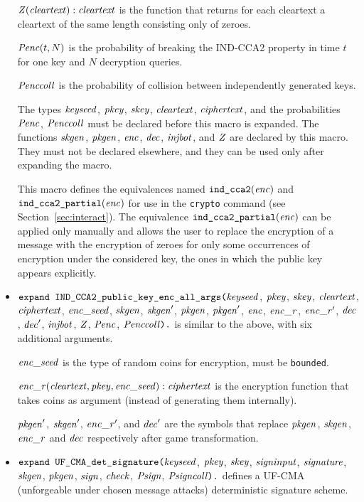 \documentclass{article}
\begin{document}
\begin{itemize}
   $\mathit{Z}(\mathit{cleartext}): \mathit{cleartext}$ is the function that
  returns for each cleartext a cleartext of the same length consisting
  only of zeroes.

   $\mathit{Penc}(t, N)$ is the probability of breaking the IND-CCA2 property
   in time $t$ for one key and $N$ decryption queries.

   $\mathit{Penccoll}$ is the probability of collision between independently generated keys.

   The types $\mathit{keyseed}$, $\mathit{pkey}$, $\mathit{skey}$,
   $\mathit{cleartext}$, $\mathit{ciphertext}$, and the
   probabilities $\mathit{Penc}$, $\mathit{Penccoll}$ must be declared before
   this macro is expanded. The functions $\mathit{skgen}$, $\mathit{pkgen}$,
   $\mathit{enc}$, $\mathit{dec}$, $\mathit{injbot}$, and $\mathit{Z}$ are declared by
   this macro. They must not be declared elsewhere, and they can be
   used only after expanding the macro.

   This macro defines the equivalences named $\texttt{ind\_cca2}(\mathit{enc})$
   and $\texttt{ind\_cca2\_partial}(\mathit{enc})$
   for use in the \texttt{crypto} command 
   (see Section~\ref{sec:interact}). The equivalence $\texttt{ind\_cca2\_partial}(\mathit{enc})$
   can be applied only manually and allows the user to replace the encryption 
   of a message with the encryption of zeroes for only some occurrences of
   encryption under the considered key, the ones in which the public key appears explicitly.

\item $\texttt{expand IND\_CCA2\_public\_key\_enc\_all\_args(}\mathit{keyseed}$, $\mathit{pkey}$, $\mathit{skey}$,
$  \mathit{cleartext}$, $\mathit{ciphertext}$, $\mathit{enc\_seed}$, $\mathit{skgen}$, $\mathit{skgen}'$, $\mathit{pkgen}$, $\mathit{pkgen}'$, $\mathit{enc}$, $\mathit{enc\_r}$, $\mathit{enc\_r}'$, $\mathit{dec}$, $\mathit{dec}'$, $\mathit{injbot}$, $\mathit{Z}$, $\mathit{Penc}$, $\mathit{Penccoll}\texttt{).}$ is similar to the above,
  with six additional arguments. 

  $\mathit{enc\_seed}$ is the type of random coins for encryption, must be \texttt{bounded}.

  $\mathit{enc\_r}(\mathit{cleartext}, \mathit{pkey}, \mathit{enc\_seed}): \mathit{ciphertext}$ is the encryption function that takes coins as argument (instead of generating them internally).

  $\mathit{pkgen}'$, $\mathit{skgen}'$, $\mathit{enc\_r}'$, and $\mathit{dec}'$ are the symbols that replace $\mathit{pkgen}$, $\mathit{skgen}$, $\mathit{enc\_r}$ and $\mathit{dec}$ respectively after game transformation.

\item $\texttt{expand UF\_CMA\_det\_signature(}\mathit{keyseed}$, $\mathit{pkey}$, $\mathit{skey}$,
$  \mathit{signinput}$, $\mathit{signature}$, $\mathit{skgen}$, $\mathit{pkgen}$, $\mathit{sign}$, $
  \mathit{check}$, $\mathit{Psign}$, $\mathit{Psigncoll}\texttt{).}$ defines a
  UF-CMA (unforgeable under chosen message attacks)
  deterministic signature scheme.


\end{itemize}
\end{document}

